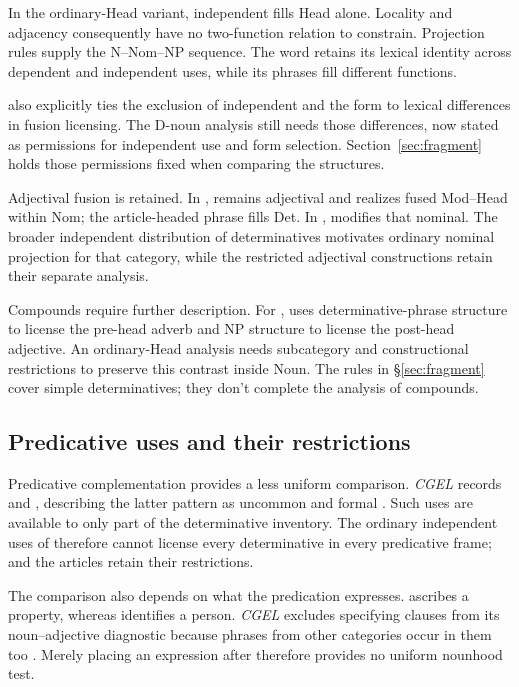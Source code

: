 \documentclass[12pt]{article}
\begin{document}
In the ordinary-Head variant, independent  fills Head alone. Locality and adjacency consequently have no two-function relation to constrain. Projection rules supply the N--Nom--NP sequence. The word  retains its lexical identity across dependent and independent uses, while its phrases fill different functions.

\textcite{Payne2007} also explicitly ties the exclusion of independent  and the form  to lexical differences in fusion licensing. The D-noun analysis still needs those differences, now stated as permissions for independent use and form selection. Section~\ref{sec:fragment} holds those permissions fixed when comparing the structures.

Adjectival fusion is retained. In ,  remains adjectival and realizes fused Mod--Head within Nom; the article-headed phrase fills Det. In ,  modifies that nominal. The broader independent distribution of determinatives motivates ordinary nominal projection for that category, while the restricted adjectival constructions retain their separate analysis.

Compounds require further description. For , \textcite{Payne2007} uses determinative-phrase structure to license the pre-head adverb and NP structure to license the post-head adjective. An ordinary-Head analysis needs subcategory and constructional restrictions to preserve this contrast inside Noun. The rules in §\ref{sec:fragment} cover simple determinatives; they don't complete the analysis of compounds.

\subsection{Predicative uses and their restrictions}\label{sec:predication}

Predicative complementation provides a less uniform comparison. \textit{CGEL} records  and , describing the latter pattern as uncommon and formal \citep[392, 395--396]{huddleston2002}. Such uses are available to only part of the determinative inventory. The ordinary independent uses of  therefore cannot license every determinative in every predicative frame;  and the articles retain their restrictions.

The comparison also depends on what the predication expresses.  ascribes a property, whereas  identifies a person. \textit{CGEL} excludes specifying  clauses from its noun--adjective diagnostic because phrases from other categories occur in them too \citep[536]{huddleston2002}. Merely placing an expression after  therefore provides no uniform nounhood test.
\end{document}
